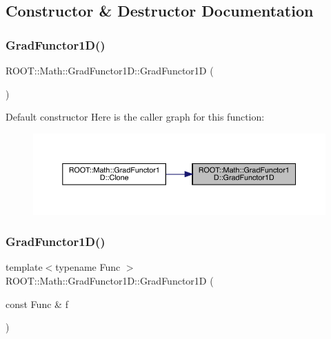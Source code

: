 \subsection{Constructor \& Destructor Documentation}
\mbox{\label{classROOT_1_1Math_1_1GradFunctor1D_a8691d070a442abf40d5709588edf93fe}} 
\subsubsection{\texorpdfstring{GradFunctor1D()}{GradFunctor1D()}\hspace{0.1cm}{\footnotesize\ttfamily [1/15]}}
{\footnotesize\ttfamily R\+O\+O\+T\+::\+Math\+::\+Grad\+Functor1\+D\+::\+Grad\+Functor1D (\begin{DoxyParamCaption}{ }\end{DoxyParamCaption})\hspace{0.3cm}{\ttfamily [inline]}}

Default constructor Here is the caller graph for this function\+:\nopagebreak
\begin{figure}[H]
\begin{center}
\leavevmode
\includegraphics[width=350pt]{d3/d76/classROOT_1_1Math_1_1GradFunctor1D_a8691d070a442abf40d5709588edf93fe_icgraph}
\end{center}
\end{figure}
\mbox{\label{classROOT_1_1Math_1_1GradFunctor1D_a740a6020efe7284e5eca301a89a127e8}} 
\subsubsection{\texorpdfstring{GradFunctor1D()}{GradFunctor1D()}\hspace{0.1cm}{\footnotesize\ttfamily [2/15]}}
{\footnotesize\ttfamily template$<$typename Func $>$ \\
R\+O\+O\+T\+::\+Math\+::\+Grad\+Functor1\+D\+::\+Grad\+Functor1D (\begin{DoxyParamCaption}\item[{const Func \&}]{f }\end{DoxyParamCaption})\hspace{0.3cm}{\ttfamily [inline]}}


